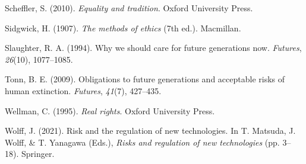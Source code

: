\documentclass[man,11pt,a4paper]{apa7}
\begin{document}
\begin{list}{}{\setlength{\leftmargin}{0.5in}\setlength{\itemindent}{-0.5in}\setlength{\itemsep}{0pt}\setlength{\parsep}{0pt}}
\item Scheffler, S. (2010). \textit{Equality and tradition}. Oxford University Press.
\item Sidgwick, H. (1907). \textit{The methods of ethics} (7th ed.). Macmillan.
\item Slaughter, R. A. (1994). Why we should care for future generations now. \textit{Futures}, \textit{26}(10), 1077--1085.
\item Tonn, B. E. (2009). Obligations to future generations and acceptable risks of human extinction. \textit{Futures}, \textit{41}(7), 427--435.
\item Wellman, C. (1995). \textit{Real rights}. Oxford University Press.
\item Wolff, J. (2021). Risk and the regulation of new technologies. In T. Matsuda, J. Wolff, \& T. Yanagawa (Eds.), \textit{Risks and regulation of new technologies} (pp. 3--18). Springer.
\end{list}
\end{document}
